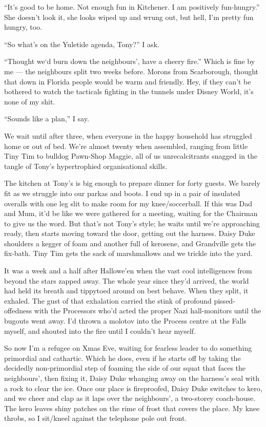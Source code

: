 ``It's good to be home. Not enough fun in Kitchener. I am positively 
fun-hungry.''
She doesn't look it, she looks wiped up and wrung out, but hell,
I'm pretty fun hungry, too.

``So what's on the Yuletide agenda, Tony?'' I ask.

``Thought we`d burn down the neighbours', have a cheery fire.''
Which is fine by me --- the neighbours split two weeks before.
Morons from Scarborough, thought that down in Florida people would
be warm and friendly. Hey, if they can't be bothered to watch the
tacticals fighting in the tunnels under Disney World, it's none of
my shit.

``Sounds like a plan,'' I say.

We wait until after three, when everyone in the happy household has
struggled home or out of bed. We're almost twenty when assembled,
ranging from little Tiny Tim to bulldog Pawn-Shop Maggie, all of us
unrecalcitrants snagged in the tangle of Tony's hypertrophied
organisational skills.

The kitchen at Tony's is big enough to prepare dinner for forty
guests. We barely fit as we struggle into our parkas and boots. I
end up in a pair of insulated overalls with one leg slit to make
room for my knee/soccerball. If this was Dad and Mum, it'd be like
we were gathered for a meeting, waiting for the Chairman to give us
the word. But that's not Tony's style; he waits until we're
approaching ready, then starts moving toward the door, getting out
the harness. Daisy Duke shoulders a kegger of foam and another full
of kerosene, and Grandville gets the fix-bath. Tiny Tim gets the
sack of marshmallows and we trickle into the yard.

It was a week and a half after Hallowe'en when the vast cool
intelligences from beyond the stars zapped away. The whole year
since they'd arrived, the world had held its breath and tippytoed
around on best behave. When they split, it exhaled. The gust of
that exhalation carried the stink of profound pissed-offedness with
the Processors who'd acted the proper Nazi hall-monitors until the
bugouts went away. I'd thrown a molotov into the Process centre at
the Falls myself, and shouted into the fire until I couldn't hear
myself.

So now I'm a refugee on Xmas Eve, waiting for fearless leader to do
something primordial and cathartic. Which he does, even if he
starts off by taking the decidedly non-primordial step of foaming
the side of our squat that faces the neighbours', then fixing it,
Daisy Duke whanging away on the harness's seal with a rock to clear
the ice. Once our place is fireproofed, Daisy Duke switches to
kero, and we cheer and clap as it laps over the neighbours', a
two-storey coach-house. The kero leaves shiny patches on the rime
of frost that covers the place. My knee throbs, so I sit/kneel
against the telephone pole out front.

